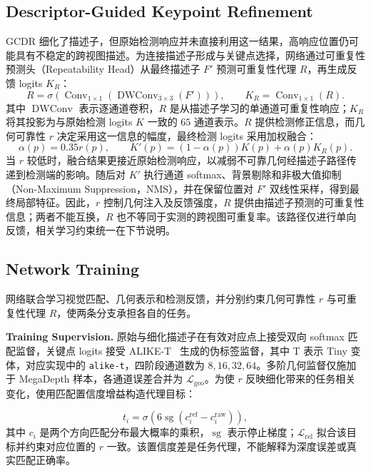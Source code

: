 \documentclass{article}
\begin{document}
\subsection{Descriptor-Guided Keypoint Refinement}
\label{sec:detection-feedback}
GCDR 细化了描述子，但原始检测响应并未直接利用这一结果，高响应位置仍可能具有不稳定的跨视图描述。为连接描述子形成与关键点选择，网络通过可重复性预测头（Repeatability Head）从最终描述子 $F'$ 预测可重复性代理 $R$，再生成反馈 logits $K_R$：
\begin{equation}
R=\sigma(\operatorname{Conv}_{1\times1}(\operatorname{DWConv}_{3\times3}(F'))),\qquad
K_R=\operatorname{Conv}_{1\times1}(R).
\label{eq:repeatability-response}
\end{equation}
其中 $\operatorname{DWConv}$ 表示逐通道卷积，$R$ 是从描述子学习的单通道可重复性响应；$K_R$ 将其投影为与原始检测 logits $K$ 一致的 $65$ 通道表示。$R$ 提供检测修正信息，而几何可靠性 $r$ 决定采用这一信息的幅度，最终检测 logits 采用加权融合：
\begin{equation}
\alpha(p)=0.35r(p),\qquad
K'(p)=(1-\alpha(p))K(p)+\alpha(p)K_R(p).
\label{eq:detection-feedback}
\end{equation}
当 $r$ 较低时，融合结果更接近原始检测响应，以减弱不可靠几何经描述子路径传递到检测端的影响。随后对 $K'$ 执行通道 softmax、背景剔除和非极大值抑制（Non-Maximum Suppression，NMS），并在保留位置对 $F'$ 双线性采样，得到最终局部特征。因此，$r$ 控制几何注入及反馈强度，$R$ 提供由描述子预测的可重复性信息；两者不能互换，$R$ 也不等同于实测的跨视图可重复率。该路径仅进行单向反馈，相关学习约束统一在下节说明。

\subsection{Network Training}
\label{sec:training}
网络联合学习视觉匹配、几何表示和检测反馈，并分别约束几何可靠性 $r$ 与可重复性代理 $R$，使两条分支承担各自的任务。

\noindent\textbf{Training Supervision.} 原始与细化描述子在有效对应点上接受双向 softmax 匹配监督，关键点 logits 接受 ALIKE-T~\cite{Zhao2023ALIKE} 生成的伪标签监督，其中 T 表示 Tiny 变体，对应实现中的 \texttt{alike-t}，四阶段通道数为 $8,16,32,64$。多阶几何监督仅施加于 MegaDepth 样本，各通道误差合并为 $\mathcal L_{\mathrm{geo}}$。为使 $r$ 反映细化带来的任务相关变化，使用匹配置信度增益构造代理目标：

\begin{equation}
t_i=\sigma\left(6\operatorname{sg}(c_i^{\mathrm{ref}}-c_i^{\mathrm{raw}})\right),
\label{eq:reliability-target}
\end{equation}
其中 $c_i$ 是两个方向匹配分布最大概率的乘积，$\operatorname{sg}$ 表示停止梯度；$\mathcal L_{\mathrm{rel}}$ 拟合该目标并约束对应位置的 $r$ 一致。该置信度差是任务代理，不能解释为深度误差或真实匹配正确率。
\end{document}
